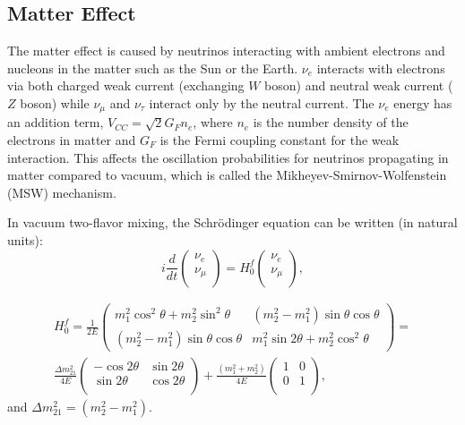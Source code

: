 \subsection{Matter Effect}\label{sect:MSW}
The matter effect is caused by neutrinos interacting with ambient electrons and nucleons in the matter such as the Sun or the Earth. $\nu_e$ interacts with electrons via both charged weak current (exchanging $W$ boson) and neutral weak current ($Z$ boson) while $\nu_\mu$ and $\nu_\tau$ interact only by the neutral current. The $\nu_e$ energy has an addition term, $V_{CC} =\sqrt2G_Fn_e$, where $n_e$ is the number density of the electrons in matter and $G_F$ is the Fermi coupling constant for the weak interaction. This affects the oscillation probabilities for neutrinos propagating in matter compared to vacuum, which is called the Mikheyev-Smirnov-Wolfenstein (MSW) mechanism\cite{smirnov2016solar,smirnov2005msw}.

In vacuum two-flavor mixing, the Schr\"{o}dinger equation can be written (in natural units)\cite{xing2011neutrinos}:
\begin{equation}\label{eq:2flavor_simple}
	i\frac{d}{dt}\begin{pmatrix}
		\nu_e\\
		\nu_\mu\\
	\end{pmatrix}
	=
	H^f_0
	\begin{pmatrix}
		\nu_e\\
		\nu_\mu\\
	\end{pmatrix},
\end{equation}

\begin{equation} \label{eq:H0f}
\begin{aligned}
 H^f_0 = \frac{1}{2E}\begin{pmatrix}m^2_1\cos^2\theta+m^2_2\sin^2\theta & (m^2_2-m^2_1)\sin\theta\cos\theta \\ (m^2_2-m^2_1)\sin\theta\cos\theta & m^2_1\sin2\theta+m^2_2\cos^2\theta\end{pmatrix} =
\\
\frac{\Delta m_{21}^2}{4E}\begin{pmatrix}
	-\cos 2\theta & \sin 2\theta\\
	\sin 2\theta & \cos 2\theta\\
\end{pmatrix}+\frac{(m_1^2+m_2^2)}{4E}\begin{pmatrix}
	1 & 0\\
	0 &1\\
\end{pmatrix},
\end{aligned}
\end{equation}
and $\Delta m^2_{21}=(m^2_2 - m^2_1)$.

